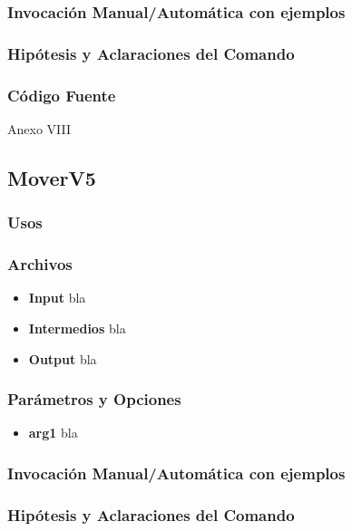 \documentclass[a4paper,10pt,titlepage]{article}
\begin{document}
		\subsubsection{Invocaci\'on Manual/Autom\'atica con ejemplos}

		\subsubsection{Hip\'otesis y Aclaraciones del Comando}

		\subsubsection{C\'odigo Fuente}
			Anexo VIII


	\subsection{MoverV5}
		\subsubsection{Usos}


		\subsubsection{Archivos}
			\begin {itemize}
				\item \textbf{Input} {bla}
				\item \textbf{Intermedios} {bla}
				\item \textbf{Output} {bla}
			\end{itemize}

		\subsubsection{Par\'ametros y Opciones}
			\begin {itemize}
				\item \textbf{arg1} {bla}
			\end{itemize}
	
		\subsubsection{Invocaci\'on Manual/Autom\'atica con ejemplos}

		\subsubsection{Hip\'otesis y Aclaraciones del Comando}
\end{document}
